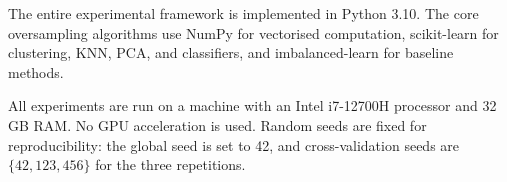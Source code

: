 The entire experimental framework is implemented in Python 3.10.
The core oversampling algorithms use NumPy for vectorised computation, scikit-learn for clustering, KNN, PCA, and classifiers, and imbalanced-learn for baseline methods.

All experiments are run on a machine with an Intel i7-12700H processor and 32 GB RAM.
No GPU acceleration is used.
Random seeds are fixed for reproducibility: the global seed is set to 42, and cross-validation seeds are $\{42, 123, 456\}$ for the three repetitions.


